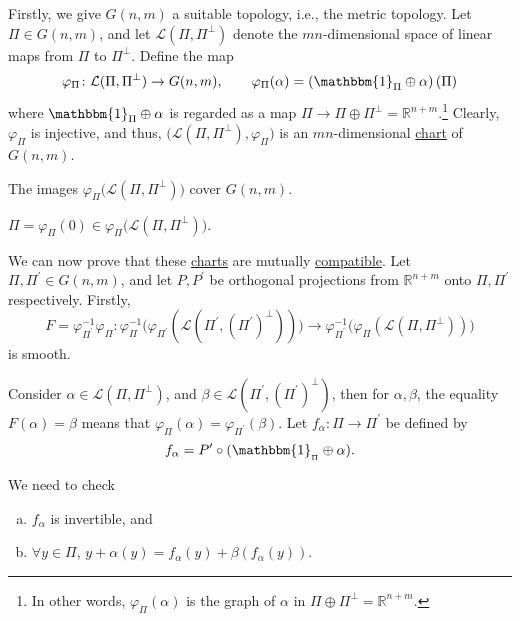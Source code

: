 Firstly, we give \(G(n, m)\) a suitable topology, i.e., the metric topology. Let \(\Pi \in G(n, m)\), and let \(\mathcal{L} (\Pi , \Pi ^{\perp})\) denote the \(mn\)-dimensional space of linear maps from \(\Pi\) to \(\Pi ^{\perp} \). Define the map
\[
	\varphi _\Pi \colon \mathcal{L} (\Pi , \Pi ^{\perp} ) \to G(n, m),\qquad
	\varphi _\Pi (\alpha ) = \left( \mathbbm{1}_{\Pi } \oplus \alpha \right) (\Pi )
\]
where \(\mathbbm{1}_{\Pi }\oplus \alpha \) is regarded as a map \(\Pi \to \Pi \oplus \Pi ^{\perp} = \mathbb{R} ^{n+m}\).\footnote{In other words, \(\varphi _\Pi (\alpha )\) is the graph of \(\alpha \) in \(\Pi \oplus \Pi ^{\perp} = \mathbb{R} ^{n+m}\).} Clearly, \(\varphi _\Pi \) is injective, and thus, \(\big(\mathcal{L} (\Pi , \Pi ^{\perp} ), \varphi _\Pi \big)\) is an \(mn\)-dimensional \hyperref[def:coordinate-chart]{chart} of \(G(n, m)\).

\begin{remark}
	The images \(\varphi _\Pi \big(\mathcal{L} (\Pi , \Pi ^{\perp} )\big)\) cover \(G(n, m)\).
\end{remark}

\begin{eg}
	\(\Pi = \varphi _\Pi (0)\in \varphi _\Pi \big(\mathcal{L} (\Pi , \Pi ^{\perp} )\big)\).
\end{eg}

We can now prove that these \hyperref[def:coordinate-chart]{charts} are mutually \hyperref[not:smoothly-compatible]{compatible}. Let \(\Pi , \Pi ^\prime \in G(n, m)\), and let \(P, P^\prime \) be orthogonal projections from \(\mathbb{R} ^{n+m}\) onto \(\Pi , \Pi ^\prime \) respectively. Firstly,
\[
	F = \varphi _{\Pi ^\prime }^{-1} \varphi _\Pi \colon \varphi _\Pi ^{-1} \big(\varphi _{\Pi ^\prime }(\mathcal{L} (\Pi ^\prime , (\Pi ^\prime )^{\perp} ))\big) \to \varphi _{\Pi ^\prime }^{-1} \big(\varphi _\Pi (\mathcal{L} (\Pi , \Pi ^{\perp} ))\big)
\]
is smooth.

\begin{center}
\end{center}

Consider \(\alpha \in \mathcal{L} (\Pi ,\Pi ^{\perp} )\), and \(\beta \in \mathcal{L} (\Pi ^\prime , (\Pi ^\prime )^{\perp} )\), then for \(\alpha , \beta \), the equality \(F(\alpha ) = \beta\) means that \(\varphi _\Pi (\alpha ) = \varphi _{\Pi ^\prime }(\beta )\). Let \(f_\alpha \colon \Pi \to \Pi ^\prime \) be defined by
\[
	f_\alpha = P^\prime \circ (\mathbbm{1}_{_\Pi }\oplus \alpha ).
\]

We need to check
\begin{enumerate}[(a)]
	\item \(f_\alpha \) is invertible, and
	\item \(\forall y\in \Pi \), \(y+\alpha (y) = f_\alpha (y) + \beta (f_\alpha (y))\).
\end{enumerate}

